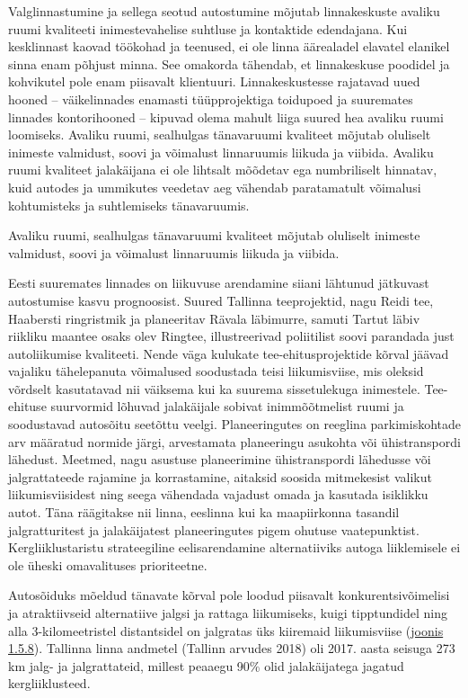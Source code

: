 \documentclass[estonian,]{article}
\begin{document}
Valglinnastumine ja sellega seotud autostumine mõjutab linnakeskuste avaliku ruumi kvaliteeti inimestevahelise suhtluse ja kontaktide edendajana. Kui kesklinnast kaovad töökohad ja teenused, ei ole linna äärealadel elavatel elanikel sinna enam põhjust minna. See omakorda tähendab, et linnakeskuse poodidel ja kohvikutel pole enam piisavalt klientuuri. Linnakeskustesse rajatavad uued hooned -- väikelinnades enamasti tüüpprojektiga toidupoed ja suuremates linnades kontorihooned -- kipuvad olema mahult liiga suured hea avaliku ruumi loomiseks. Avaliku ruumi, sealhulgas tänavaruumi kvaliteet mõjutab oluliselt inimeste valmidust, soovi ja võimalust linnaruumis liikuda ja viibida. Avaliku ruumi kvaliteet jalakäijana ei ole lihtsalt mõõdetav ega numbriliselt hinnatav, kuid autodes ja ummikutes veedetav aeg vähendab paratamatult võimalusi kohtumisteks ja suhtlemiseks tänavaruumis.

\begin{blockquote-left}
Avaliku ruumi, sealhulgas tänavaruumi kvaliteet mõjutab oluliselt
inimeste valmidust, soovi ja võimalust linnaruumis liikuda ja viibida.
\end{blockquote-left}

Eesti suuremates linnades on liikuvuse arendamine siiani lähtunud jätkuvast autostumise kasvu prognoosist. Suured Tallinna teeprojektid, nagu Reidi tee, Haabersti ringristmik ja planeeritav Rävala läbimurre, samuti Tartut läbiv riikliku maantee osaks olev Ringtee, illustreerivad poliitilist soovi parandada just autoliikumise kvaliteeti. Nende väga kulukate tee-ehitusprojektide kõrval jäävad vajaliku tähelepanuta võimalused soodustada teisi liikumisviise, mis oleksid võrdselt kasutatavad nii väiksema kui ka suurema sissetulekuga inimestele. Tee-ehituse suurvormid lõhuvad jalakäijale sobivat inimmõõtmelist ruumi ja soodustavad autosõitu seetõttu veelgi. Planeeringutes on reeglina parkimiskohtade arv määratud normide järgi, arvestamata planeeringu asukohta või ühistranspordi lähedust. Meetmed, nagu asustuse planeerimine ühistranspordi lähedusse või jalgrattateede rajamine ja korrastamine, aitaksid soosida mitmekesist valikut liikumisviisidest ning seega vähendada vajadust omada ja kasutada isiklikku autot. Täna räägitakse nii linna, eeslinna kui ka maapiirkonna tasandil jalgratturitest ja jalakäijatest planeeringutes pigem ohutuse vaatepunktist. Kergliiklustaristu strateegiline eelisarendamine alternatiiviks autoga liiklemisele ei ole üheski omavalituses prioriteetne.

Autosõiduks mõeldud tänavate kõrval pole loodud piisavalt konkurentsivõimelisi ja atraktiivseid alternatiive jalgsi ja rattaga liikumiseks, kuigi tipptundidel ning alla 3-kilomeetristel distantsidel on jalgratas üks kiiremaid liikumisviise (\protect\hyperlink{figure158}{joonis 1.5.8}). Tallinna linna andmetel (Tallinn arvudes 2018) oli 2017. aasta seisuga 273 km jalg- ja jalgrattateid, millest peaaegu 90\% olid jalakäijatega jagatud kergliiklusteed.
\end{document}
